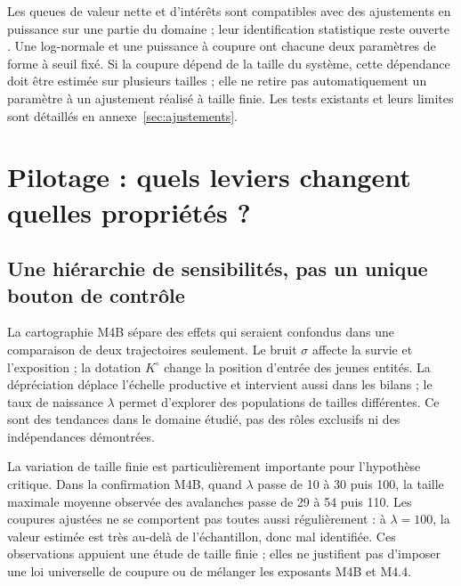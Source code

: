 Les queues de valeur nette et d'intérêts sont compatibles avec des
ajustements en puissance sur une partie du domaine ; leur identification
statistique reste ouverte \cite{clauset,wildauer}. Une log-normale et une
puissance à coupure ont chacune deux paramètres de forme à seuil fixé.
Si la coupure dépend de la taille du système, cette dépendance doit être
estimée sur plusieurs tailles ; elle ne retire pas automatiquement un
paramètre à un ajustement réalisé à taille finie. Les tests existants et
leurs limites sont détaillés en annexe~\ref{sec:ajustements}.

\section{Pilotage : quels leviers changent quelles propriétés ?}\label{sec:pilotage}
\subsection{Une hiérarchie de sensibilités, pas un unique bouton de contrôle}
La cartographie M4B sépare des effets qui seraient confondus dans une
comparaison de deux trajectoires seulement. Le bruit $\sigma$ affecte
la survie et l'exposition ; la dotation $K^\circ$ change la position d'entrée des
jeunes entités. La dépréciation déplace l'échelle productive et intervient
aussi dans les bilans ; le taux de naissance $\lambda$ permet d'explorer
des populations de tailles différentes. Ce sont des tendances dans le
domaine étudié, pas des rôles exclusifs ni des indépendances démontrées.


La variation de taille finie est particulièrement importante pour
l'hypothèse critique. Dans la confirmation M4B, quand $\lambda$ passe
de 10 à 30 puis 100, la taille maximale moyenne observée des avalanches
passe de 29 à 54 puis 110. Les coupures ajustées ne se comportent pas
toutes aussi régulièrement : à $\lambda=100$, la valeur estimée est
très au-delà de l'échantillon, donc mal identifiée. Ces observations
appuient une étude de taille finie ; elles ne justifient pas d'imposer
une loi universelle de coupure ou de mélanger les exposants M4B et M4.4.

